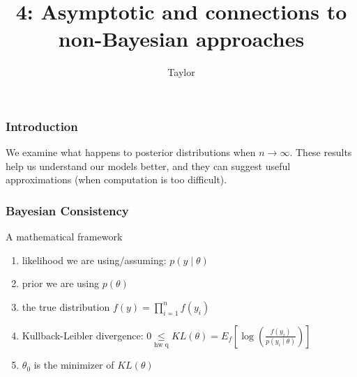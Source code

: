 \documentclass{beamer}
\title["4"]{4: Asymptotic and connections to non-Bayesian approaches}
\author{Taylor}
\institute[UVA] 
{
University of Virginia \\
\medskip
\textit{} 
}
\date{}
\begin{document}

\begin{frame}
\titlepage 
\end{frame}

\begin{frame}
\frametitle{Introduction}

We examine what happens to posterior distributions when $n \to \infty$. These results help us understand our models better, and they can suggest useful approximations (when computation is too difficult).
\newline


\end{frame}
\begin{frame}
\frametitle{Bayesian Consistency}

A mathematical framework
\begin{enumerate}
\item likelihood we are using/assuming: $p(y \mid \theta)$
\item prior we are using $p(\theta)$
\item the true distribution $f(y) = \prod_{i=1}^n f(y_i)$
\item Kullback-Leibler divergence: $0 \underset{\text{hw q}}{\le} KL(\theta) = E_f\left[\log\left(\frac{ f(y_i) }{p(y_i \mid \theta) } \right) \right]$
\item $\theta_0$ is the minimizer of $KL(\theta)$
\end{enumerate}

\end{frame}
\end{document}
